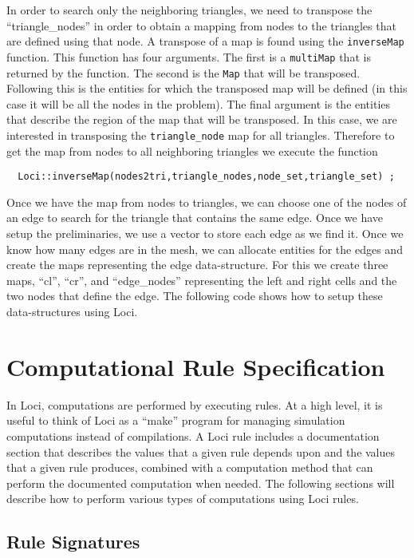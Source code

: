 \documentclass[10pt,epsf]{book}
\begin{document}
In order to search only the neighboring triangles, we need to
transpose the ``triangle\_nodes'' in order to obtain a mapping from
nodes to the triangles that are defined using that node.  A transpose
of a map is found using the {\tt inverseMap} function.  This function has
four arguments.  The first is a {\tt multiMap} that is returned by the
function.  The second is the {\tt Map} that will be transposed.
Following this is the entities for which the transposed map will be
defined (in this case it will be all the nodes in the problem).  The
final argument is the entities that describe the region of the map
that will be transposed.  In this case, we are interested in
transposing the {\tt triangle\_node} map for all triangles.  Therefore
to get the map from nodes to all neighboring triangles we execute the
function 
\begin{verbatim}
  Loci::inverseMap(nodes2tri,triangle_nodes,node_set,triangle_set) ;
\end{verbatim}

Once we have the map from nodes to triangles, we can choose one of the
nodes of an edge to search for the triangle that contains the same
edge.  Once we have setup the preliminaries, we use a vector to store
each edge as we find it.  Once we know how many edges are in the mesh,
we can allocate entities for the edges and create the maps
representing the edge data-structure.  For this we create three maps,
``cl'', ``cr'', and ``edge\_nodes'' representing the left and right
cells and the two nodes that define the edge.  The following code
shows how to setup these data-structures using Loci.



\chapter{Computational Rule Specification}

In Loci, computations are performed by executing rules.  At a high
level, it is useful to think of Loci as a ``make'' program for
managing simulation computations instead of compilations.  A Loci rule
includes a documentation section that describes the values that a
given rule depends upon and the values that a given rule produces,
combined with a computation method that can perform the documented
computation when needed.  The following sections will describe how to
perform various types of computations using Loci rules.

\section{Rule Signatures}
\end{document}
